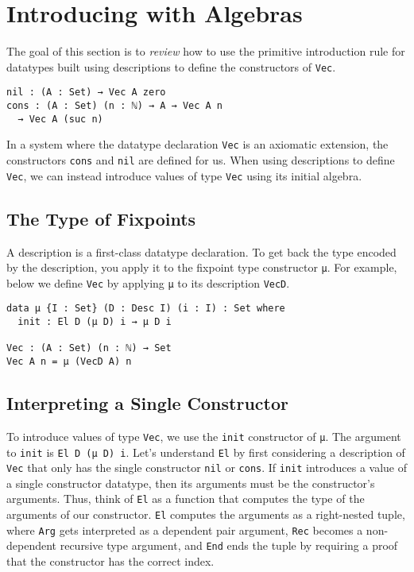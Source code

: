 \documentclass[preprint,nonatbib]{sigplanconf}
\begin{document}
\section{Introducing with Algebras}
\label{sec:init}

The goal of this section is to {\it review} how to use the primitive
introduction rule for datatypes built using descriptions to define the
constructors of {\tt Vec}.

\begin{verbatim}
nil : (A : Set) → Vec A zero
cons : (A : Set) (n : ℕ) → A → Vec A n
  → Vec A (suc n)
\end{verbatim}

In a system where the datatype declaration {\tt Vec} is an axiomatic
extension, the constructors {\tt cons} and {\tt nil} are defined for
us. When using descriptions to define {\tt Vec}, we can instead
introduce values of type {\tt Vec} using its initial algebra.

\subsection{The Type of Fixpoints}

A description is a first-class datatype declaration. To get back the
type encoded by the description, you apply it to the fixpoint type
constructor {\tt μ}. For example, below we define {\tt Vec} by
applying {\tt μ} to its description {\tt VecD}.

\begin{verbatim}
data μ {I : Set} (D : Desc I) (i : I) : Set where
  init : El D (μ D) i → μ D i

Vec : (A : Set) (n : ℕ) → Set
Vec A n = μ (VecD A) n
\end{verbatim}

\subsection{Interpreting a Single Constructor}
\label{sec:init:el}

To introduce values of type {\tt Vec}, we use the
{\tt init} constructor of {\tt μ}. The argument to {\tt init} is
{\tt El D (μ D) i}. Let's understand {\tt El} by first considering a
description of {\tt Vec} that only has the single constructor
{\tt nil} or {\tt cons}. If {\tt init} introduces
a value of a single constructor datatype, then its arguments must be
the constructor's arguments. Thus, think of
{\tt El} as a function that computes the type of the arguments of our
constructor. {\tt El} computes the arguments as a right-nested tuple,
where {\tt Arg} gets interpreted as a dependent pair argument,
{\tt Rec} becomes a non-dependent recursive type argument, and
{\tt End} ends the tuple by requiring a proof that the constructor has
the correct index.
\end{document}
